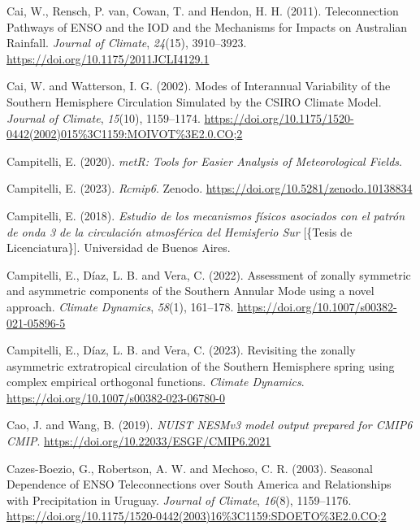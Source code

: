 \documentclass[12pt,oneside,a4paper]{reedthesis}
\newlength{\cslhangindent}
\newenvironment{CSLReferences}[2] %
 {%
  \setlength{\parindent}{0pt}
  \ifodd #1 \everypar{\setlength{\hangindent}{\cslhangindent}}\ignorespaces\fi
  \ifnum #2 > 0
  \setlength{\parskip}{#2\baselineskip}
  \fi
 }%
 {}
\begin{document}
\begin{CSLReferences}{1}{0}
\leavevmode{}%
Cai, W., Rensch, P. van, Cowan, T. and Hendon, H. H. (2011). Teleconnection {Pathways} of {ENSO} and the {IOD} and the {Mechanisms} for {Impacts} on {Australian Rainfall}. \emph{Journal of Climate}, \emph{24}(15), 3910--3923. \url{https://doi.org/10.1175/2011JCLI4129.1}

\leavevmode{}%
Cai, W. and Watterson, I. G. (2002). Modes of {Interannual Variability} of the {Southern Hemisphere Circulation Simulated} by the {CSIRO Climate Model}. \emph{Journal of Climate}, \emph{15}(10), 1159--1174. \url{https://doi.org/10.1175/1520-0442(2002)015\%3C1159:MOIVOT\%3E2.0.CO;2}

\leavevmode{}%
Campitelli, E. (2020). \emph{{metR}: {Tools} for {Easier Analysis} of {Meteorological Fields}}.

\leavevmode{}%
Campitelli, E. (2023). \emph{Rcmip6}. Zenodo. \url{https://doi.org/10.5281/zenodo.10138834}

\leavevmode{}%
Campitelli, E. (2018). \emph{{Estudio de los mecanismos f{í}sicos asociados con el patr{ó}n de onda 3 de la circulaci{ó}n atmosf{é}rica del Hemisferio Sur}} {[}\{Tesis de Licenciatura\}{]}. Universidad de Buenos Aires.

\leavevmode{}%
Campitelli, E., Díaz, L. B. and Vera, C. (2022). Assessment of zonally symmetric and asymmetric components of the {Southern Annular Mode} using a novel approach. \emph{Climate Dynamics}, \emph{58}(1), 161--178. \url{https://doi.org/10.1007/s00382-021-05896-5}

\leavevmode{}%
Campitelli, E., Díaz, L. B. and Vera, C. (2023). Revisiting the zonally asymmetric extratropical circulation of the {Southern Hemisphere} spring using complex empirical orthogonal functions. \emph{Climate Dynamics}. \url{https://doi.org/10.1007/s00382-023-06780-0}

\leavevmode{}%
Cao, J. and Wang, B. (2019). \emph{NUIST NESMv3 model output prepared for CMIP6 CMIP}. \url{https://doi.org/10.22033/ESGF/CMIP6.2021}

\leavevmode{}%
Cazes-Boezio, G., Robertson, A. W. and Mechoso, C. R. (2003). Seasonal {Dependence} of {ENSO Teleconnections} over {South America} and {Relationships} with {Precipitation} in {Uruguay}. \emph{Journal of Climate}, \emph{16}(8), 1159--1176. \url{https://doi.org/10.1175/1520-0442(2003)16\%3C1159:SDOETO\%3E2.0.CO;2}


\end{CSLReferences}
\end{document}

